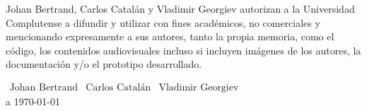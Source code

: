 Johan Bertrand, Carlos Catalán y Vladimir Georgiev autorizan a la Universidad Complutense a difundir y utilizar con fines académicos, no comerciales y mencionando expresamente a sus autores, tanto la propia memoria, como el código, los contenidos audiovisuales incluso si incluyen imágenes de los autores, la documentación y/o el prototipo desarrollado.\\
\begin{center}
	\vspace{4.5in}

	\large

	
	$\begin{array}{ccc}
		\text{Johan Bertrand} & \text{Carlos Catalán} & \text{Vladimir Georgiev}
	\end{array}$\\
	\vspace{0.4in} a \today
\end{center}

\normalsize


